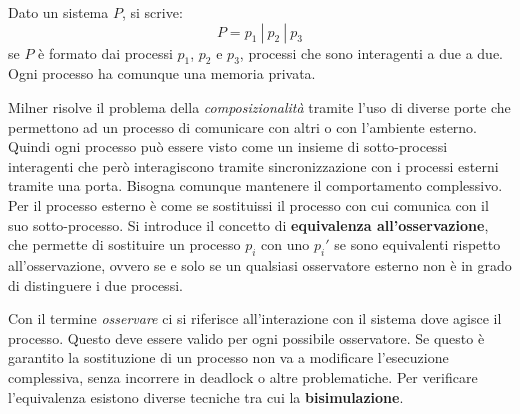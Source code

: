 Dato un sistema $P$, si scrive:
\begin{equation}
    P = p_1 \ | \ p_2 \ | \ p_3
\end{equation}
se $P$ è formato dai processi $p_1$, $p_2$ e $p_3$, processi che sono interagenti
a due a due. Ogni processo ha comunque una memoria privata.

Milner risolve il problema della \textit{composizionalità} tramite l'uso di
diverse porte che permettono ad un processo di comunicare con altri o con
l'ambiente esterno. Quindi ogni processo può essere visto come un insieme di
sotto-processi interagenti che però interagiscono tramite sincronizzazione con i
processi esterni tramite una porta. Bisogna comunque mantenere il comportamento
complessivo. Per il processo esterno è come se sostituissi il processo con cui
comunica con il suo sotto-processo. Si introduce il concetto di
\textbf{equivalenza all'osservazione}, che permette di sostituire un processo
$p_i$ con uno $p_i'$ se sono equivalenti rispetto all'osservazione, ovvero se e
solo se un qualsiasi osservatore esterno non è in grado di distinguere i due
processi.

Con il termine \textit{osservare} ci si riferisce all'interazione con il sistema
dove agisce il processo. Questo deve essere valido per ogni possibile osservatore.
Se questo è garantito la sostituzione di un processo non va a modificare
l'esecuzione complessiva, senza incorrere in deadlock o altre problematiche.
Per verificare l'equivalenza esistono diverse tecniche tra cui la
\textbf{bisimulazione}.

